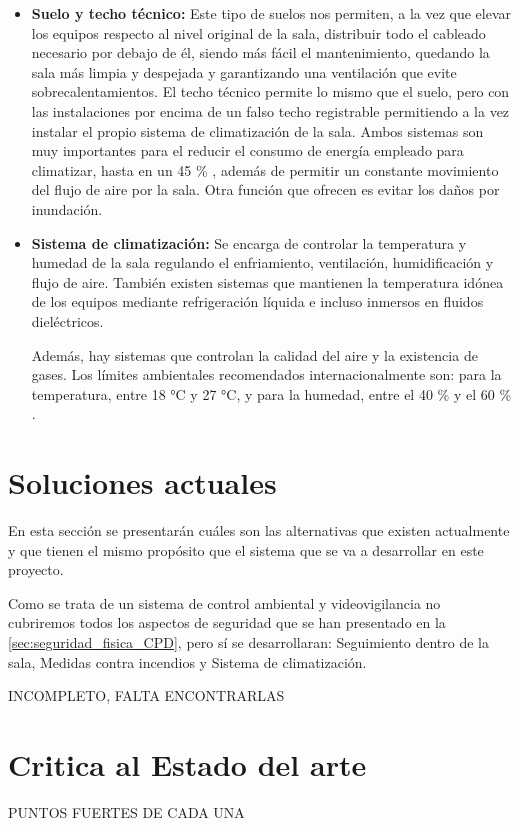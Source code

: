 \begin{itemize}
	\item \textbf{Suelo y techo técnico:} Este tipo de suelos nos permiten, a la vez que elevar los equipos respecto al nivel original de la sala, distribuir todo el cableado necesario por debajo de él, siendo más fácil el mantenimiento, quedando la sala más limpia y despejada y garantizando una ventilación que evite sobrecalentamientos. El techo técnico permite lo mismo que el suelo, pero con las instalaciones por encima de un falso techo registrable permitiendo a la vez instalar el propio sistema de climatización de la sala. Ambos sistemas son muy importantes para el reducir el consumo de energía empleado para climatizar, hasta en un 45 \% \cite{noauthor_suelo_2020}, además de permitir un constante movimiento del flujo de aire por la sala. Otra función que ofrecen es evitar los daños por inundación.
	\item \textbf{Sistema de climatización:} Se encarga de controlar la temperatura y humedad de la sala regulando el enfriamiento, ventilación, humidificación y flujo de aire. También existen sistemas que mantienen la temperatura idónea de los equipos mediante refrigeración líquida e incluso inmersos en fluidos dieléctricos.
	
	Además, hay sistemas que controlan la calidad del aire y la existencia de gases. Los límites ambientales recomendados internacionalmente son: para la temperatura, entre 18 °C y 27 °C, y para la humedad, entre el 40 \% y el 60 \% \cite{noauthor_recommended_nodate}.
\end{itemize}

\section{Soluciones actuales}
En esta sección se presentarán cuáles son las alternativas que existen actualmente y que tienen el mismo propósito que el sistema que se va a desarrollar en este proyecto.

Como se trata de un sistema de control ambiental y videovigilancia no cubriremos todos los aspectos de seguridad que se han presentado en la \autoref{sec:seguridad_fisica_CPD}, pero sí se desarrollaran: Seguimiento dentro de la sala, Medidas contra incendios y Sistema de climatización.

INCOMPLETO, FALTA ENCONTRARLAS

\section{Critica al Estado del arte}
PUNTOS FUERTES DE CADA UNA

